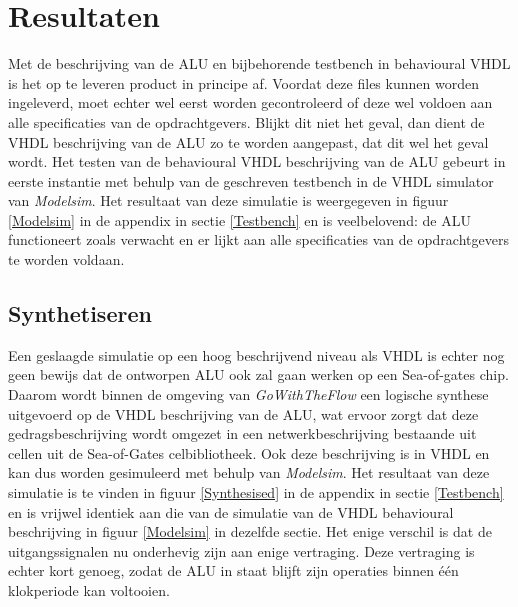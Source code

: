 \documentclass[11pt,twoside,a4paper]{article}
\begin{document}
\newpage
\section{Resultaten}
Met de beschrijving van de ALU en bijbehorende testbench in behavioural VHDL is het op te leveren product in principe af. Voordat deze files kunnen worden ingeleverd, moet echter wel eerst worden gecontroleerd of deze wel voldoen aan alle specificaties van de opdrachtgevers. Blijkt dit niet het geval, dan dient de VHDL beschrijving van de ALU zo te worden aangepast, dat dit wel het geval wordt. Het testen van de behavioural VHDL beschrijving van de ALU gebeurt in eerste instantie met behulp van de geschreven testbench in de VHDL simulator van \emph{Modelsim}. Het resultaat van deze simulatie is weergegeven in figuur \ref{Modelsim} in de appendix in sectie \ref{Testbench} en is veelbelovend: de ALU functioneert zoals verwacht en er lijkt aan alle specificaties van de opdrachtgevers te worden voldaan.

\subsection{Synthetiseren}
Een geslaagde simulatie op een hoog beschrijvend niveau als VHDL is echter nog geen bewijs dat de ontworpen ALU ook zal gaan werken op een Sea-of-gates chip. Daarom wordt binnen de omgeving van \emph{GoWithTheFlow} een logische synthese uitgevoerd op de VHDL beschrijving van de ALU, wat ervoor zorgt dat deze gedragsbeschrijving wordt omgezet in een netwerkbeschrijving bestaande uit cellen uit de Sea-of-Gates celbibliotheek. Ook deze beschrijving is in VHDL en kan dus worden gesimuleerd met behulp van \emph{Modelsim}. Het resultaat van deze simulatie is te vinden in figuur \ref{Synthesised} in de appendix in sectie \ref{Testbench} en is vrijwel identiek aan die van de simulatie van de VHDL behavioural beschrijving in figuur \ref{Modelsim} in dezelfde sectie. Het enige verschil is dat de uitgangssignalen nu onderhevig zijn aan enige vertraging. Deze vertraging is echter kort genoeg, zodat de ALU in staat blijft zijn operaties binnen \'e\'en klokperiode kan voltooien.
\end{document}
